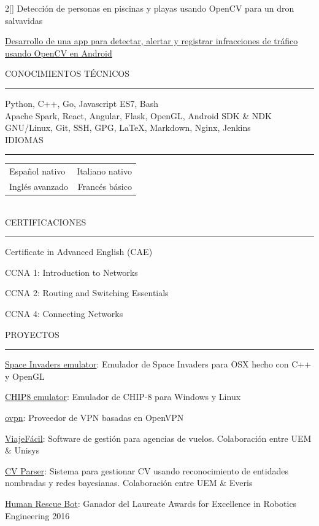 \documentclass[a4paper, 12pt]{article}
\newenvironment{myparacol}[2][]{%
\begin{paracol}{#2}[#1]\setlength{\parindent}{0pt}}{%
\end{paracol}}
\begin{document}
\begin{myparacol}{2}
    Detección de personas en piscinas y playas usando OpenCV para un dron salvavidas

    \href{https://github.com/hugo19941994/infrac-coche}{Desarrollo de una app para detectar, alertar y registrar infracciones de tráfico usando OpenCV en Android}
    \\

    \switchcolumn

    CONOCIMIENTOS TÉCNICOS
    \vspace{1mm}
    \hrule
    \kern9pt

    Python, C++, Go, Javascript ES7, Bash\\

    Apache Spark, React, Angular, Flask, OpenGL, Android SDK \& NDK\\

    GNU/Linux, Git, SSH, GPG, \LaTeX, Markdown, Nginx, Jenkins\\

    IDIOMAS
    \vspace{1mm}
    \hrule
    \kern9pt
    \noindent\begin{tabular}{ @{} l r }
        Español nativo & Italiano nativo\\
        Inglés avanzado & Francés básico\\
    \end{tabular}
    \\

    CERTIFICACIONES
    \vspace{1mm}
    \hrule
    \kern9pt
    Certificate in Advanced English (CAE)

    CCNA 1: Introduction to Networks

    CCNA 2: Routing and Switching Essentials

    CCNA 4: Connecting Networks

    \switchcolumn

    \noindent PROYECTOS
    \vspace{1mm}
    \hrule
    \kern9pt
    \href{https://github.com/hugo19941994/space-invaders-emu}{Space Invaders emulator}: Emulador de Space Invaders para OSX hecho con C++ y OpenGL

    \href{https://github.com/hugo19941994/chip8-emu}{CHIP8 emulator}: Emulador de CHIP-8 para Windows y Linux

    \href{https://vpn.hugofs.com}{ovpn}: Proveedor de VPN basadas en OpenVPN

    \href{https://github.com/hugo19941994/ViajeFacil}{ViajeFácil}: Software de gestión para agencias de vuelos. Colaboración entre UEM \& Unisys

    \href{https://github.com/hugo19941994/cv-parser}{CV Parser}: Sistema para gestionar CV usando reconocimiento de entidades nombradas y redes bayesianas. Colaboración entre UEM \& Everis

    \href{https://github.com/hugo19941994/robot}{Human Rescue Bot}: Ganador del Laureate Awards for Excellence in Robotics Engineering 2016

\end{myparacol}
\end{document}
